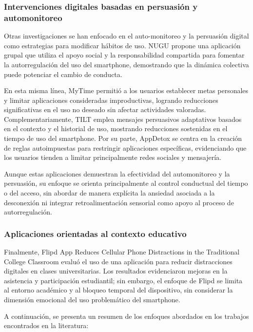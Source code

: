 \subsubsection{Intervenciones digitales basadas en persuasión y automonitoreo}

Otras investigaciones se han enfocado en el auto-monitoreo y la persuasión digital como estrategias para modificar hábitos de uso. NUGU \cite{KoYangLee2015} propone una aplicación grupal que utiliza el apoyo social y la responsabilidad compartida para fomentar la autorregulación del uso del smartphone, demostrando que la dinámica colectiva puede potenciar el cambio de conducta. 

En esta misma línea, MyTime \cite{Hiniker2016} permitió a los usuarios establecer metas personales y limitar aplicaciones consideradas improductivas, logrando reducciones significativas en el uso no deseado sin afectar actividades valoradas. Complementariamente, TILT \cite{FoulonneauCalvaryVillain2016} emplea mensajes persuasivos adaptativos basados en el contexto y el historial de uso, mostrando reducciones sostenidas en el tiempo de uso del smartphone. Por su parte, AppDetox \cite{LoechtefeldBoehmerGanev2013} se centra en la creación de reglas autoimpuestas para restringir aplicaciones específicas, evidenciando que los usuarios tienden a limitar principalmente redes sociales y mensajería.

Aunque estas aplicaciones demuestran la efectividad del automonitoreo y la persuasión, su enfoque se orienta principalmente al control conductual del tiempo o del acceso, sin abordar de manera explícita la ansiedad asociada a la desconexión ni integrar retroalimentación sensorial como apoyo al proceso de autorregulación.

\subsubsection{Aplicaciones orientadas al contexto educativo}

Finalmente, Flipd App Reduces Cellular Phone Distractions in the Traditional College Classroom \cite{Neuwirth2020} evaluó el uso de una aplicación para reducir distracciones digitales en clases universitarias. Los resultados evidenciaron mejoras en la asistencia y participación estudiantil; sin embargo, el enfoque de Flipd se limita al entorno académico y al bloqueo temporal del dispositivo, sin considerar la dimensión emocional del uso problemático del smartphone.

A continuación, se presenta un resumen de los enfoques abordados en los trabajos encontrados en la literatura:

